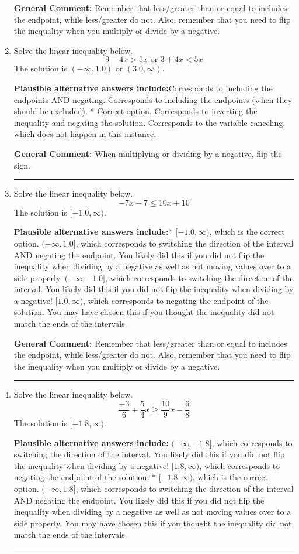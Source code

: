 \documentclass{extbook}[14pt]
\newcommand{\litem}[1]{\item #1

\rule{\textwidth}{0.4pt}}
\begin{document}
\begin{enumerate}
{\textbf{General Comment:} Remember that less/greater than or equal to includes the endpoint, while less/greater do not. Also, remember that you need to flip the inequality when you multiply or divide by a negative.
}
\litem{
Solve the linear inequality below.
\[ 9 - 4 x > 5 x \text{ or } 3 + 4 x < 5 x \]The solution is \( (-\infty, 1.0) \text{ or } (3.0, \infty) \).\begin{enumerate}[label=\Alph*.]
\textbf{Plausible alternative answers include:}Corresponds to including the endpoints AND negating.
Corresponds to including the endpoints (when they should be excluded).
 * Correct option.
Corresponds to inverting the inequality and negating the solution.
Corresponds to the variable canceling, which does not happen in this instance.
\end{enumerate}

\textbf{General Comment:} When multiplying or dividing by a negative, flip the sign.
}
\litem{
Solve the linear inequality below.
\[ -7x -7 \leq 10x + 10 \]The solution is \( [-1.0, \infty) \).\begin{enumerate}[label=\Alph*.]
\textbf{Plausible alternative answers include:}* $[-1.0, \infty)$, which is the correct option.
 $(-\infty, 1.0]$, which corresponds to switching the direction of the interval AND negating the endpoint. You likely did this if you did not flip the inequality when dividing by a negative as well as not moving values over to a side properly.
 $(-\infty, -1.0]$, which corresponds to switching the direction of the interval. You likely did this if you did not flip the inequality when dividing by a negative!
 $[1.0, \infty)$, which corresponds to negating the endpoint of the solution.
You may have chosen this if you thought the inequality did not match the ends of the intervals.
\end{enumerate}

\textbf{General Comment:} Remember that less/greater than or equal to includes the endpoint, while less/greater do not. Also, remember that you need to flip the inequality when you multiply or divide by a negative.
}
\litem{
Solve the linear inequality below.
\[ \frac{-3}{6} + \frac{5}{4} x \geq \frac{10}{9} x - \frac{6}{8} \]The solution is \( [-1.8, \infty) \).\begin{enumerate}[label=\Alph*.]
\textbf{Plausible alternative answers include:} $(-\infty, -1.8]$, which corresponds to switching the direction of the interval. You likely did this if you did not flip the inequality when dividing by a negative!
 $[1.8, \infty)$, which corresponds to negating the endpoint of the solution.
* $[-1.8, \infty)$, which is the correct option.
 $(-\infty, 1.8]$, which corresponds to switching the direction of the interval AND negating the endpoint. You likely did this if you did not flip the inequality when dividing by a negative as well as not moving values over to a side properly.
You may have chosen this if you thought the inequality did not match the ends of the intervals.
\end{enumerate}

}
\end{enumerate}
\end{document}
